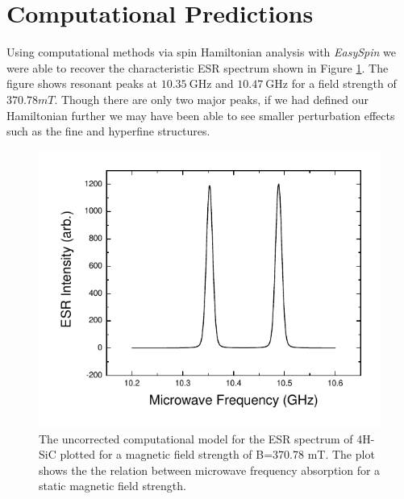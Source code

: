 \documentclass[oneside, noacknowlegments]{BYUPhys}
\begin{document}
\section{Computational Predictions}

Using computational methods via spin Hamiltonian analysis with \textit{EasySpin} we were able to recover the characteristic ESR spectrum shown in Figure \ref{fig:SiCModel}. The figure shows resonant peaks at $10.35~\text{GHz}$ and $10.47~\text{GHz}$ for a field strength of $370.78 mT$. Though there are only two major peaks, if we had defined our Hamiltonian further we may have been able to see smaller perturbation effects such as the fine and hyperfine structures.

\begin{figure}[H]
    \centerline{\includegraphics{p14-esr-uncorrected}}
    \caption[ESR Computational Model for SiC]{\label{fig:SiCModel}
     The uncorrected computational model for the ESR spectrum of 4H-SiC plotted for a magnetic field strength of B=370.78 mT. The plot shows the the relation between microwave frequency absorption for a static magnetic field strength.}
 \end{figure}
\end{document}
